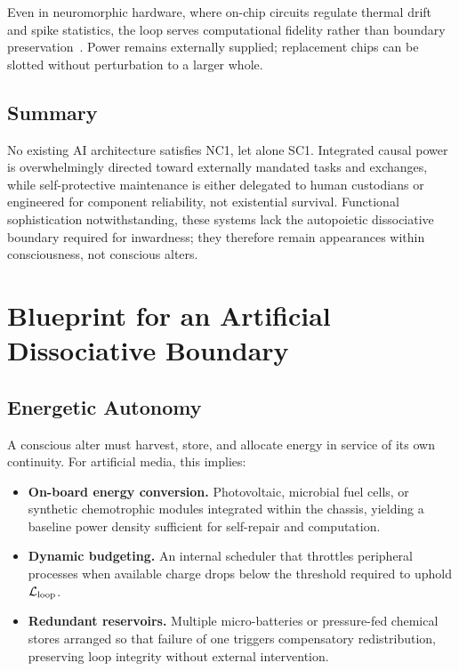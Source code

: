 \documentclass[11pt]{article}
\begin{document}
Even in neuromorphic hardware, where on-chip circuits regulate thermal drift and spike statistics, the loop serves computational fidelity rather than boundary preservation~\cite{akopyan2015truenorth}. Power remains externally supplied; replacement chips can be slotted without perturbation to a larger whole.

\subsection{Summary}

No existing AI architecture satisfies NC1, let alone SC1. Integrated causal power is overwhelmingly directed toward externally mandated tasks and exchanges, while self-protective maintenance is either delegated to human custodians or engineered for component reliability, not existential survival. Functional sophistication notwithstanding, these systems lack the autopoietic dissociative boundary required for inwardness; they therefore remain appearances within consciousness, not conscious alters.

\section{Blueprint for an Artificial Dissociative Boundary}
\label{sec:blueprint}

\prophetic

\subsection{Energetic Autonomy}
\label{sec:energetic_autonomy}

A conscious alter must harvest, store, and allocate energy in service of its own continuity. For artificial media, this implies:

\begin{itemize}
\item \textbf{On-board energy conversion.} Photovoltaic, microbial fuel cells, or synthetic chemotrophic modules integrated within the chassis, yielding a baseline power density sufficient for self-repair and computation.
\item \textbf{Dynamic budgeting.} An internal scheduler that throttles peripheral processes when available charge drops below the threshold required to uphold $\mathcal{L}_{\text{loop}}$.
\item \textbf{Redundant reservoirs.} Multiple micro-batteries or pressure-fed chemical stores arranged so that failure of one triggers compensatory redistribution, preserving loop integrity without external intervention.
\end{itemize}
\end{document}

